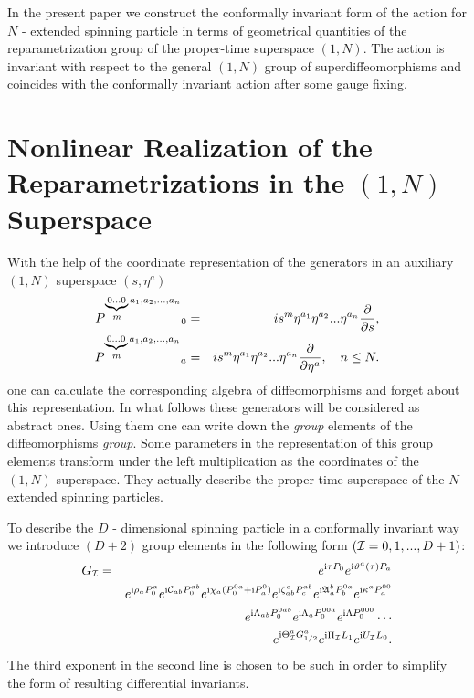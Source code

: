 \documentclass[a4paper,twocolumn,showpacs,preprintnumbers,amsmath,amssymb]{revtex4}
\newcommand{\A}{\mathfrak{A}}
\begin{document}
In the present paper we construct the conformally invariant
form\cite{M,S}
of the action for $N$ - extended spinning
particle\cite{GT,HPPT} in terms of geometrical quantities
of the reparametrization group of the proper-time
superspace $(1,N)$. The action is invariant
with respect to the general $(1,N)$ group of
 superdiffeomorphisms
and coincides with the conformally invariant
action\cite{M,S} after some gauge fixing.

\section{Nonlinear Realization of the Reparametrizations
in the $(1,N)$ Superspace}
With the help of the coordinate representation of the generators
in an auxiliary $(1,N)$ superspace $(s,\eta^a)$
\begin{eqnarray}                \label{rep}
{P^{\underbrace{\mbox{\scriptsize 0...0}}_{\mbox{\em\scriptsize m}}
a_1,a_2,...,a_n}}_0&=&
is^m\eta^{a_1}\eta^{a_2}... \eta^{a_n}\frac{\partial}
{\partial s},\\\nonumber
{P^{\underbrace{\mbox{\scriptsize 0...0}}_{\mbox{\em\scriptsize m}}a_1,a_2,...,a_n}}_a&=&
is^m\eta^{a_1}\eta^{a_2}... \eta^{a_n}\frac{\partial}
{\partial \eta^a},\quad  n\leq N.
\end{eqnarray}
one can calculate
the corresponding algebra of diffeomorphisms and forget
about this representation. In what follows these generators
will be considered as abstract ones. Using them one can
write down the {\em group} elements of the diffeomorphisms
{\em group}. Some parameters in the representation of this
group elements transform under the left multiplication
as the coordinates of the $(1,N)$ superspace. They
actually describe the proper-time superspace of the $N$ - extended
spinning particles.

To describe the $D$ - dimensional spinning particle in a conformally
invariant way we
introduce $(D+2)$  group elements in the following form $({\cal I}=
0,1,...,D+1)$:
\begin{eqnarray}\label{group}
G_{\cal I} &=& e^{{\rm i}\tau P_0}
 e^{{\rm i}\vartheta^a(\tau) P_a} \nonumber\\
&&  e^{{\rm i}\rho_a P^a_0}
e^{{\rm i}{\cal C}_{ab} P^{ab}_0}
e^{{\rm i}\chi_a (P^{0a}_0+{\rm i}P^0_a)}
e^{{\rm i}\zeta_{ab}^c P^{ab}_c}
e^{{\rm i}\A_a^b P^{0a}_b}
e^{{\rm i}\kappa^a P^{00}_a}\nonumber\\
&&  e^{{\rm i}\Lambda_{ab} P^{0ab}_0}
e^{{\rm i}\Lambda_a P^{00a}_0}
e^{{\rm i}\Lambda P^{000}_0} \cdots \nonumber\\
&&
e^{{\rm i}\Theta_{\cal I}^a G_{1/2}^a}  e^{{\rm i}\Pi_{\cal I}L_1}
 e^{{\rm i}U_{\cal I}L_0}.
\end{eqnarray}
The third exponent in the second line is chosen to be such in order to simplify
the form of resulting differential invariants.
\end{document}
